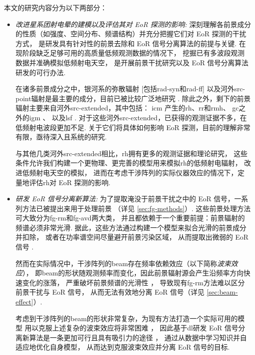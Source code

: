 本文的研究内容分为以下两部分：
\begin{itemize}
\item
\emph{改进星系团射电晕的建模以及评估其对 EoR 探测的影响:}
深刻理解各前景成分的性质（如强度、空间分布、频谱结构）并充分把握它们对 EoR 探测的干扰方式，
是研发具有针对性的前景去除和 EoR 信号分离算法的前提与关键.
在现阶段缺乏足够可用的高质量低频观测数据的情况下，
挖掘已有多波段观测数据并准确模拟低频射电天空，
是开展前景干扰研究以及 EoR 信号分离算法研发的可行办法.

\hspace{2\ccwd}%
在诸多前景成分之中，银河系的弥散辐射 [包括\ac{rad-syn}和\ac{rad-ff}]
以及河外\ac{src-point}辐射是最主要的成分，目前已被比较广泛地研究
\cite{shaver1999,diMatteo2004,gleser2008,liu2012,murray2017,spinelli2018}.
除此之外，剩下的前景辐射主要来自河外\ac{src-extended}，其中包括：
\ac{icm} \cite{feretti2012} 产生的\ac{rh}、\ac{rr}和\ac{rmh}、
\ac{gc}之外的\ac{igm} \cite{keshet2004}、
以及\ac{lsf} \cite{vazza2015}.
对于这些河外\ac{src-extended}，已获得的观测证据不多，在低频射电波段更加不足.
关于它们将具体如何影响 EoR 探测，目前的理解非常有限，亟待深入且系统的研究.

\hspace{2\ccwd}%
与其他几类河外\ac{src-extended}相比，\ac{rh}拥有更多的观测证据和理论研究，
这些条件允许我们构建一个更物理、更完善的模型用来模拟\ac{rh}的低频射电辐射，
改进低频射电天空的模拟，
进而在考虑干涉阵列的实际仪器效应的情况下，定量地评估\ac{rh}对 EoR 探测的影响.

\item
\emph{研发 EoR 信号分离新算法:}
为了提取淹没于前景干扰之中的 EoR 信号，一系列方法已被提出来用于处理前景
（详见 \autoref{sec:fg-methods}）.
这些前景处理方法可大致分为\ac{fg-rm}和\ac{fg-avd}两大类，
并且都依赖于一个重要前提：前景辐射的频谱必须非常光滑.
据此，这些方法通过构建一个模型来拟合光滑的前景成分并扣除，
或者在功率谱空间尽量避开前景污染区域，
从而提取出微弱的 EoR 信号 \cite{chapman2016}.

\hspace{2\ccwd}%
然而在实际情况中，干涉阵列的\ac{beam}存在频率依赖效应（以下简称\emph{波束效应}），
即\ac{beam}的形状随观测频率而变化，因此前景辐射源会产生沿频率方向快速变化的涨落，
严重破坏前景频谱的光滑性 \cite{liu2009ps}，
导致现有\ac{fg-rm}方法难以区分前景干扰与 EoR 信号，
从而无法有效地分离 EoR 信号（详见 \autoref{sec:beam-effect}）.

\hspace{2\ccwd}%
考虑到干涉阵列的\ac{beam}的形状非常复杂，为现有方法打造一个实际可用的模型
用以克服上述复杂的波束效应将非常困难 \cite{lochner2015}，
因此基于\ac{dl}研发 EoR 信号分离新算法是一条更加可行且具有吸引力的途径
\cite{herbel2018,vafaeiSadr2019}，
通过从数据中学习知识并自适应地优化自身模型，
从而达到克服波束效应并分离 EoR 信号的目标.

\end{itemize}

